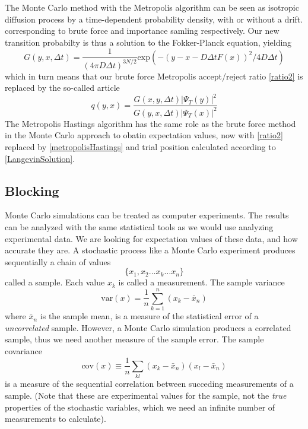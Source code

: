 \documentclass[english, a4paper]{article}
\begin{document}
\noindent The Monte Carlo method with the Metropolis algorithm can be seen as isotropic diffusion process by a time-dependent 
probability density, with or without a drift. corresponding to brute force and importance samling respectively.
Our new transition probabilty is thus a solution to the Fokker-Planck equation, yielding
\begin{equation}
 G(y, x, \Delta t) = \frac{1}{(4\pi D \Delta t)^{3N/2}}
 \textrm{exp}(-(y - x - D\Delta t F(x))^2 / 4D\Delta t)
\end{equation}
which in turn means that our brute force Metropolis accept/reject ratio \eqref{ratio2} is replaced by
the so-called  article
\begin{equation}
 q(y, x) = \frac{G(x, y, \Delta t)|\Psi_T(y)|^2}{G(y, x, \Delta t)|\Psi_T(x)|^2}
 \label{metropolisHastings}
\end{equation}
The Metropolis Hastings algorithm has the same role as the brute force method in the Monte Carlo approach
to obatin expectation values, now with \eqref{ratio2} replaced by \eqref{metropolisHastings} and trial position
calculated according to \eqref{LangevinSolution}.





\subsection*{Blocking}

Monte Carlo simulations can be treated as computer experiments. The results can be analyzed with the same
statistical tools as we would use analyzing experimental data. We are looking for expectation values
of these data, and how accurate they are.
A stochastic process like a Monte Carlo experiment produces sequentially a chain of values
\begin{equation}
 \{x_1, x_2 \dots x_k \dots x_n \}
\end{equation}
called a sample. Each value $x_k$ is called a measurement. The sample variance
\begin{equation}
 \textrm{var}(x) = \frac{1}{n} \sum_{k=1}^n (x_k - \bar{x}_n)
 \label{samplevariance}
\end{equation}
where $\bar{x}_n$ is the sample mean, is a measure of the statistical error of a \textit{uncorrelated} sample.
However, a Monte Carlo simulation produces a correlated sample, thus we need another measure of the sample error.
The sample covariance
\begin{equation}
 \textrm{cov}(x) \equiv \frac{1}{n} \sum_{kl} (x_k - \bar{x}_n) (x_l - \bar{x}_n)
\end{equation}
is a measure of the sequential correlation between succeding measurements of a sample.
(Note that these are experimental values for the sample, not the \textit{true} properties of
the stochastic variables, which we need an infinite number of measurements to calculate).\\
\end{document}
